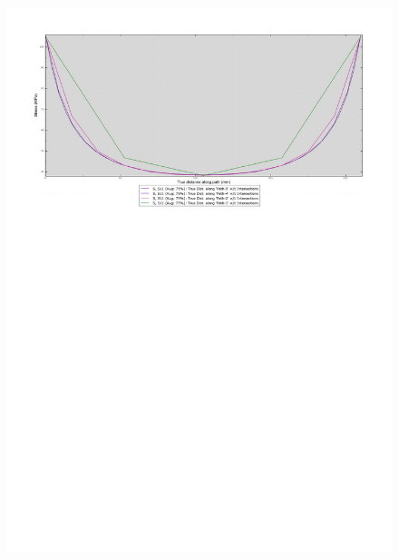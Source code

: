 \begin{figure}
{\includegraphics[width=\textwidth,trim=0 1.4cm 0 0,clip]{rel2/img2/GraficoMeshUnite.pdf}} \\

\end{figure}
